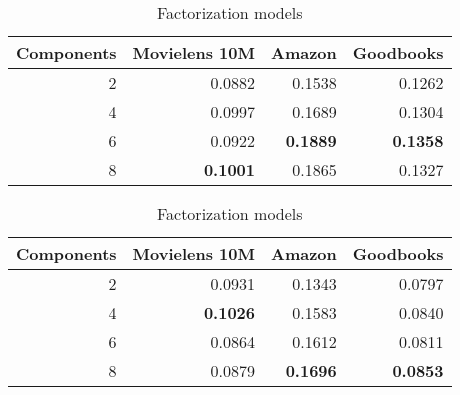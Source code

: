 \begin{table}
\caption{Effect of number of mixture components}
\label{tab:nummixtures}
\begin{subtable}{\columnwidth}
\caption{Sequence models}
\begin{tabularx}{\columnwidth}{rrrr}
\toprule
   Components &   Movielens 10M &   Amazon &   Goodbooks \\
\midrule
            2 &          0.0882 &   0.1538 &      0.1262 \\
            4 &          0.0997 &   0.1689 &      0.1304 \\
            6 &          0.0922 &   \textbf{0.1889} &      \textbf{0.1358} \\
            8 &          \textbf{0.1001} &   0.1865 &      0.1327 \\
\bottomrule
\end{tabularx}
\end{subtable}
\hspace{\fill}
\begin{subtable}{\columnwidth}
\caption{Factorization models}
\begin{tabularx}{\columnwidth}{rrrr}
\toprule
   Components &   Movielens 10M &   Amazon &   Goodbooks \\
\midrule
            2 &          0.0931 &   0.1343 &      0.0797 \\
            4 &          \textbf{0.1026} &   0.1583 &      0.0840 \\
            6 &          0.0864 &   0.1612 &      0.0811 \\
            8 &          0.0879 &   \textbf{0.1696} &      \textbf{0.0853} \\
\bottomrule
\end{tabularx}
\end{subtable}\end{table}
